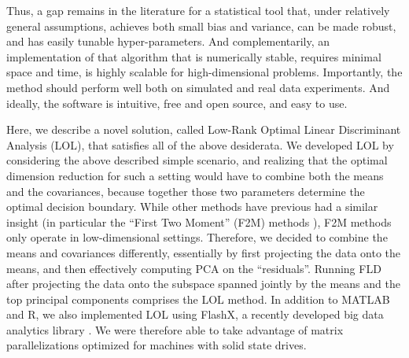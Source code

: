 \documentclass[10pt]{article}
\begin{document}



Thus, a gap remains in the literature for a statistical tool that, under relatively general assumptions, achieves both small bias and variance, can be made robust, and has easily tunable hyper-parameters.  And complementarily, an implementation of that algorithm that is numerically stable, requires minimal space and time, is highly scalable for high-dimensional problems. Importantly, the method should perform well both on simulated and real data experiments.  And ideally, the software is intuitive, free and open source, and easy to use.

Here, we describe a novel solution, called Low-Rank Optimal Linear Discriminant Analysis (LOL), that satisfies all of the above desiderata. We developed LOL by considering the above described simple scenario, and realizing that the optimal dimension reduction for such a setting would have to combine both the means and the covariances, because together those two parameters determine the optimal decision boundary.  While other methods have previous had a similar insight (in particular the ``First Two Moment'' (F2M) methods \cite{Li1991a, Tishby1999a, Globerson2003a, Cook2005a,Fukumizu2004a}), F2M methods only operate in low-dimensional settings.  Therefore, we decided to combine the means and covariances differently, essentially by first projecting the data onto the means, and then effectively computing PCA on the ``residuals''.  Running FLD after projecting the data onto the subspace spanned jointly by the means and the top principal components comprises the LOL method.  In addition to MATLAB and R, we also implemented LOL using FlashX, a recently developed big data analytics library \cite{??}.  We were therefore able to take advantage of matrix parallelizations optimized for machines with solid state drives.  
\end{document}
